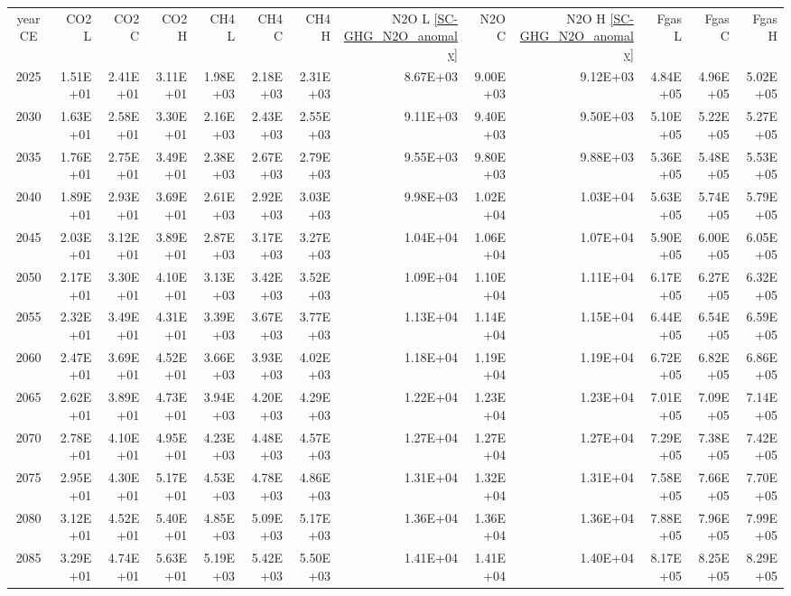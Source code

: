 \documentclass{article}
\begin{document}
\begin{table}
\begin{tabular}{crrr|rrr|rrr|rrr}
year CE  & CO2 L    & CO2 C    & CO2 H    & CH4 L    & CH4 C    & CH4 H    & N2O L \ref{SC-GHG_N2O_anomaly}     & N2O C      & N2O H \ref{SC-GHG_N2O_anomaly}    & Fgas L   & Fgas C   & Fgas H   \\
2025     & 1.51E+01 & 2.41E+01 & 3.11E+01 & 1.98E+03 & 2.18E+03 & 2.31E+03 & 8.67E+03 & 9.00E+03 & 9.12E+03 & 4.84E+05 & 4.96E+05 & 5.02E+05 \\
2030     & 1.63E+01 & 2.58E+01 & 3.30E+01 & 2.16E+03 & 2.43E+03 & 2.55E+03 & 9.11E+03 & 9.40E+03 & 9.50E+03 & 5.10E+05 & 5.22E+05 & 5.27E+05 \\
2035     & 1.76E+01 & 2.75E+01 & 3.49E+01 & 2.38E+03 & 2.67E+03 & 2.79E+03 & 9.55E+03 & 9.80E+03 & 9.88E+03 & 5.36E+05 & 5.48E+05 & 5.53E+05 \\
2040     & 1.89E+01 & 2.93E+01 & 3.69E+01 & 2.61E+03 & 2.92E+03 & 3.03E+03 & 9.98E+03 & 1.02E+04 & 1.03E+04 & 5.63E+05 & 5.74E+05 & 5.79E+05 \\
2045     & 2.03E+01 & 3.12E+01 & 3.89E+01 & 2.87E+03 & 3.17E+03 & 3.27E+03 & 1.04E+04 & 1.06E+04 & 1.07E+04 & 5.90E+05 & 6.00E+05 & 6.05E+05 \\
2050     & 2.17E+01 & 3.30E+01 & 4.10E+01 & 3.13E+03 & 3.42E+03 & 3.52E+03 & 1.09E+04 & 1.10E+04 & 1.11E+04 & 6.17E+05 & 6.27E+05 & 6.32E+05 \\
2055     & 2.32E+01 & 3.49E+01 & 4.31E+01 & 3.39E+03 & 3.67E+03 & 3.77E+03 & 1.13E+04 & 1.14E+04 & 1.15E+04 & 6.44E+05 & 6.54E+05 & 6.59E+05 \\
2060     & 2.47E+01 & 3.69E+01 & 4.52E+01 & 3.66E+03 & 3.93E+03 & 4.02E+03 & 1.18E+04 & 1.19E+04 & 1.19E+04 & 6.72E+05 & 6.82E+05 & 6.86E+05 \\
2065     & 2.62E+01 & 3.89E+01 & 4.73E+01 & 3.94E+03 & 4.20E+03 & 4.29E+03 & 1.22E+04 & 1.23E+04 & 1.23E+04 & 7.01E+05 & 7.09E+05 & 7.14E+05 \\
2070     & 2.78E+01 & 4.10E+01 & 4.95E+01 & 4.23E+03 & 4.48E+03 & 4.57E+03 & 1.27E+04 & 1.27E+04 & 1.27E+04 & 7.29E+05 & 7.38E+05 & 7.42E+05 \\
2075     & 2.95E+01 & 4.30E+01 & 5.17E+01 & 4.53E+03 & 4.78E+03 & 4.86E+03 & 1.31E+04 & 1.32E+04 & 1.31E+04 & 7.58E+05 & 7.66E+05 & 7.70E+05 \\
2080     & 3.12E+01 & 4.52E+01 & 5.40E+01 & 4.85E+03 & 5.09E+03 & 5.17E+03 & 1.36E+04 & 1.36E+04 & 1.36E+04 & 7.88E+05 & 7.96E+05 & 7.99E+05 \\
2085     & 3.29E+01 & 4.74E+01 & 5.63E+01 & 5.19E+03 & 5.42E+03 & 5.50E+03 & 1.41E+04 & 1.41E+04 & 1.40E+04 & 8.17E+05 & 8.25E+05 & 8.29E+05 \\

\end{tabular}
\end{table}
\end{document}
